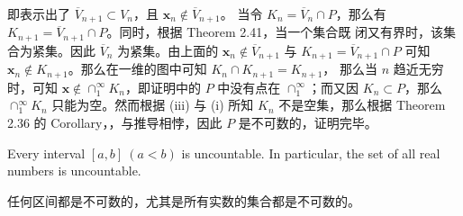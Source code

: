 \documentclass[../poma-notes.tex]{subfiles}
\begin{document}
\begin{anote}
\begin{itemize}
\begin{center}
          \end{center}
          即表示出了 $\overline{V}_{n+1} \subset V_n$，且 $\mathbf{x}_n \notin \overline{V}_{n+1}$。
          当令 $K_n = \overline{V}_n \cap P$，那么有 $K_{n+1} = \overline{V}_{n+1} \cap P$。同时，根据 Theorem 2.41，当一个集合既
          闭又有界时，该集合为紧集。因此 $\overline{V}_n$ 为紧集。由上面的 $\mathbf{x}_n \notin \overline{V}_{n+1}$ 与
          $K_{n+1} = \overline{V}_{n+1} \cap P$ 可知 $\mathbf{x}_n \notin K_{n+1}$。那么在一维的图中可知 $K_n\cap K_{n+1}=K_{n+1}$，
          那么当 $n$ 趋近无穷时，可知 $\mathbf{x} \notin \cap_1^{\infty} K_n$，即证明中的 $P$ 中没有点在 $\cap_1^{\infty}$；而又因
          $K_n \subset P$，那么 $\cap_1^{\infty} K_n$ 只能为空。然而根据 (iii) 与 (i) 所知 $K_n$ 不是空集，那么根据 Theorem 2.36 的
          Corollary，，与推导相悖，因此 $P$ 是不可数的，证明完毕。
  \end{itemize}
\end{anote}

\begin{corollary}
  Every interval $[a,b]\ (a<b)$ is uncountable. In particular, the set of all real numbers is uncountable.
\end{corollary}

\begin{anote}
  任何区间都是不可数的，尤其是所有实数的集合都是不可数的。
\end{anote}
\end{document}
